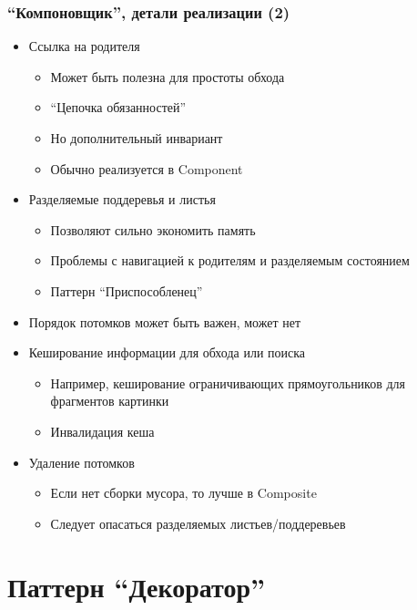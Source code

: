 \documentclass{../../slides-style}
\begin{document}
    \begin{frame}
        \frametitle{``Компоновщик'', детали реализации (2)}
        \begin{itemize}
            \item Ссылка на родителя
            \begin{itemize}
                \item Может быть полезна для простоты обхода
                \item ``Цепочка обязанностей''
                \item Но дополнительный инвариант
                \item Обычно реализуется в Component
            \end{itemize}
            \item Разделяемые поддеревья и листья
            \begin{itemize}
                \item Позволяют сильно экономить память
                \item Проблемы с навигацией к родителям и разделяемым состоянием
                \item Паттерн ``Приспособленец''
            \end{itemize}
            \item Порядок потомков может быть важен, может нет
            \item Кеширование информации для обхода или поиска
            \begin{itemize}
                \item Например, кеширование ограничивающих прямоугольников для фрагментов картинки
                \item Инвалидация кеша
            \end{itemize}
            \item Удаление потомков
            \begin{itemize}
                \item Если нет сборки мусора, то лучше в Composite
                \item Следует опасаться разделяемых листьев/поддеревьев
            \end{itemize}
        \end{itemize}
    \end{frame}

    \section{Паттерн ``Декоратор''}
\end{document}
